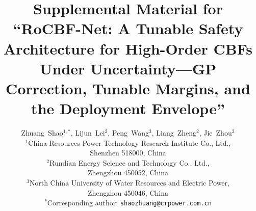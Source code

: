 \documentclass[12pt,a4paper]{article}
\begin{document}
\title{Supplemental Material for\\ ``RoCBF-Net: A Tunable Safety Architecture for High-Order CBFs Under Uncertainty---GP Correction, Tunable Margins, and the Deployment Envelope''}

\author{
Zhuang~Shao$^{1,*}$, Lijun~Lei$^{2}$, Peng~Wang$^{3}$, Liang~Zheng$^{2}$, Jie~Zhou$^{2}$\\[1em]
$^{1}$China Resources Power Technology Research Institute Co., Ltd.,\\
\hspace*{1em}Shenzhen 518000, China\\
$^{2}$Rundian Energy Science and Technology Co., Ltd.,\\
\hspace*{1em}Zhengzhou 450052, China\\
$^{3}$North China University of Water Resources and Electric Power,\\
\hspace*{1em}Zhengzhou 450046, China\\[0.5em]
$^{*}$Corresponding author: \texttt{shaozhuang@crpower.com.cn}
}

\date{}
\maketitle







\end{document}
